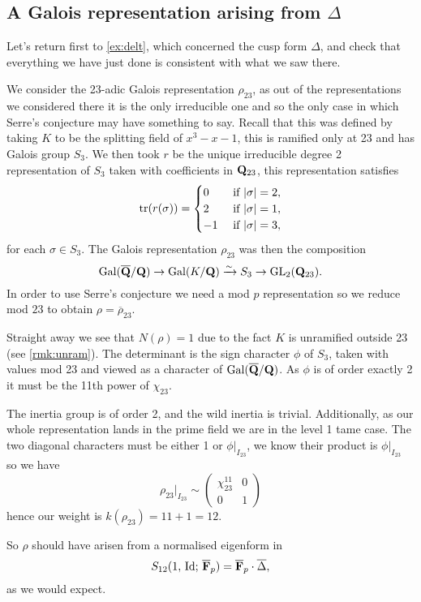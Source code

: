 \documentclass[a4paper,12pt]{article}
\begin{document}
\subsection{A Galois representation arising from $\Delta$}
Let's return first to \cref{ex:delt}, which concerned the cusp form $\Delta$, and check that everything we have just done is consistent with what we saw there.

\begin{ex}
We consider the 23-adic Galois representation $\rho_{23}$, as out of the representations we considered there it is the only irreducible one and so the only case in which Serre's conjecture may have something to say.
Recall that this was defined by taking $K$ to be the splitting field of $x^3 - x - 1$, this is ramified only at 23 and has Galois group $S_3$.
We then took $r$ be the unique irreducible degree 2 representation of $S_3$ taken with coefficients in $\mathbf{Q}_{23}$, this representation satisfies
\[
\operatorname{tr}(r(\sigma)) = \begin{cases}
0 &\text{ if } |\sigma| = 2,\\
2 &\text{ if } |\sigma| = 1,\\
-1 &\text{ if } |\sigma| = 3,
\end{cases}
\]
for each $\sigma \in S_3$.
The Galois representation $\rho_{23}$ was then the composition
\[
\operatorname{Gal}(\overline{\mathbf{Q}}/\mathbf{Q}) \to \operatorname{Gal}(K/\mathbf{Q}) \xrightarrow{\sim} S_3 \to \operatorname{GL}_2(\mathbf{Q}_{23}).
\]
In order to use Serre's conjecture we need a mod $p$ representation so we reduce mod $23$ to obtain $\rho = \overline{\rho}_{23}$.

Straight away we see that $N(\rho) = 1$ due to the fact $K$ is unramified outside 23 (see \cref{rmk:unram}).
The determinant is the sign character $\phi$ of $S_3$, taken with values mod 23 and viewed as a character of $\operatorname{Gal}(\overline{\mathbf{Q}}/\mathbf{Q})$.
As $\phi$ is of order exactly 2 it must be the 11th power of $\chi_{23}$.

The inertia group is of order 2, and the wild inertia is trivial.
Additionally, as our whole representation lands in the prime field we are in the level 1 tame case.
The two diagonal characters must be either 1 or $\phi|_{I_{23}}$, we know their product is $\phi|_{I_{23}}$ so we have
\[
\rho_{23}|_{I_{23}} \sim
\begin{pmatrix}
\chi_{23}^{11} & 0 \\
0    & 1 \end{pmatrix}
\]
hence our weight is $k(\rho_{23}) =11 + 1 = 12$.

So $\rho$ should have arisen from a normalised eigenform in
\[
S_{12}(1,\,\mathrm{Id};\,\overline{\mathbf{F}}_p) = \overline{\mathbf{F}}_p\cdot \overline{\Delta},
\]
as we would expect.
\end{ex}
\end{document}
